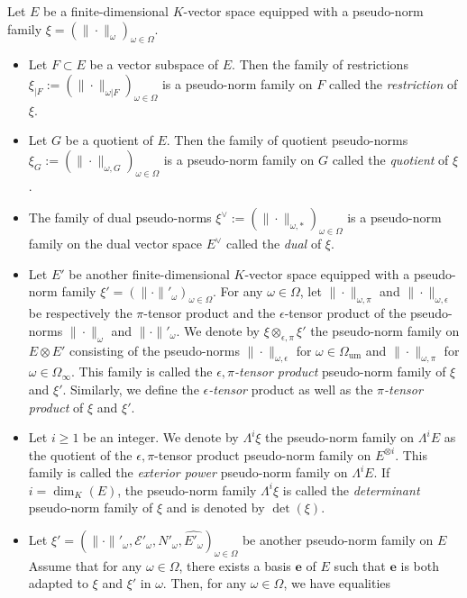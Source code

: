 \documentclass [11pt,reqno]{amsart}
\newcommand{\1}{\mathmybb{1}}
\def\cE{{\mathcal{E}}}
\def\um{\operatorname{um}}
\begin{document}
\begin{proposition-definition}
\label{def:properties_semi-norm_family}
Let $E$ be a finite-dimensional $K$-vector space equipped with a pseudo-norm family $\xi =(\|\cdot\|_\omega)_{\omega\in \Omega}$.
\begin{itemize}
	\item[(1)] Let $F\subset E$ be a vector subspace of $E$. Then the family of restrictions $\xi_{|F}:=(\|\cdot\|_{\omega|F})_{\omega\in \Omega}$ is a pseudo-norm family on $F$ called the \emph{restriction} of $\xi$.
	\item[(2)] Let $G$ be a quotient of $E$. Then the family of quotient pseudo-norms $\xi_{G}:=(\|\cdot\|_{\omega,G})_{\omega\in \Omega}$ is a pseudo-norm family on $G$ called the \emph{quotient} of $\xi$.
	\item[(3)] The family of dual pseudo-norms $\xi^{\vee}:=(\|\cdot\|_{\omega,\ast})_{\omega\in \Omega}$ is a pseudo-norm family on the dual vector space $E^{\vee}$ called the \emph{dual} of $\xi$. 
	\item[(4)] Let $E'$ be another finite-dimensional $K$-vector space equipped with a pseudo-norm family $\xi' =(\|\cdot\|'_\omega)_{\omega\in \Omega}$. For any $\omega\in \Omega$, let $\|\cdot\|_{\omega,\pi}$ and $\|\cdot\|_{\omega,\epsilon}$ be respectively the $\pi$-tensor product and the $\epsilon$-tensor product of the pseudo-norms $\|\cdot\|_{\omega}$ and $\|\cdot\|'_{\omega}$. We denote by $\xi \otimes_{\epsilon,\pi} \xi'$ the pseudo-norm family on $E \otimes E'$ consisting of the pseudo-norms $\|\cdot\|_{\omega,\epsilon}$ for $\omega\in\Omega_{\um}$ and $\|\cdot\|_{\omega,\pi}$ for $\omega\in\Omega_{\infty}$. This family is called the $\epsilon,\pi$\emph{-tensor product} pseudo-norm family of $\xi$ and $\xi'$. Similarly, we define the $\epsilon$\emph{-tensor} product as well as the $\pi$\emph{-tensor product} of $\xi$ and $\xi'$.
	\item[(5)] Let $i\geq 1$ be an integer. We denote by $\Lambda^{i}\xi$ the pseudo-norm family on $\Lambda^{i}E$ as the quotient of the $\epsilon,\pi$-tensor product pseudo-norm family on $E^{\otimes i}$. This family is called the \emph{exterior power} pseudo-norm family on $\Lambda^{i}E$. If $i=\dim_{K}(E)$, the pseudo-norm family $\Lambda^{i}\xi$ is called the \emph{determinant} pseudo-norm family of $\xi$ and is denoted by $\det(\xi)$.
	\item[(6)] Let $\xi' =(\|\cdot\|'_{\omega},\cE'_{\omega},N'_{\omega},\widehat{E'_{\omega}})_{\omega\in \Omega}$ be another pseudo-norm family on $E$ Assume that for any $\omega\in\Omega$, there exists a basis $\mathbf{e}$ of $E$ such that $\mathbf{e}$ is both adapted to $\xi$ and $\xi'$ in $\omega$. Then, for any $\omega\in\Omega$, we have equalities 

\end{itemize}
\end{proposition-definition}
\end{document}
